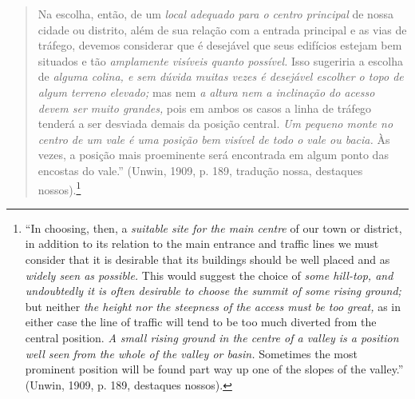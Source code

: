 \documentclass[12pt, a4paper]{book} %
\begin{document}
        \begin{quotation}
            Na escolha, então, de um \textit{local adequado para o centro principal} de nossa cidade ou distrito, além de sua relação com a entrada principal e as vias de tráfego, devemos considerar que é desejável que seus edifícios estejam bem situados e tão \textit{amplamente visíveis quanto possível.} Isso sugeriria a escolha de \textit{alguma colina, e sem dúvida muitas vezes é desejável escolher o topo de algum terreno elevado;} mas nem \textit{a altura nem a inclinação do acesso devem ser muito grandes,} pois em ambos os casos a linha de tráfego tenderá a ser desviada demais da posição central. \textit{Um pequeno monte no centro de um vale é uma posição bem visível de todo o vale ou bacia.} Às vezes, a posição mais proeminente será encontrada em algum ponto das encostas do vale.'' (Unwin, 1909, p. 189, tradução nossa, destaques nossos).\footnote[64]{``In choosing, then, a \textit{suitable site for the main centre} of our town or district, in addition to its relation to the main entrance and traffic lines we must consider that it is desirable that its buildings should be well placed and as \textit{widely seen as possible.} This would suggest the choice of \textit{some hill-top, and undoubtedly it is often desirable to choose the summit of some rising ground;} but neither \textit{the height nor the steepness of the access must be too great,} as in either case the line of traffic will tend to be too much diverted from the central position. \textit{A small rising ground in the centre of a valley is a position well seen from the whole of the valley or basin.} Sometimes the most prominent position will be found part way up one of the slopes of the valley.'' (Unwin, 1909, p. 189, destaques nossos).}
        \end{quotation}
\end{document}
